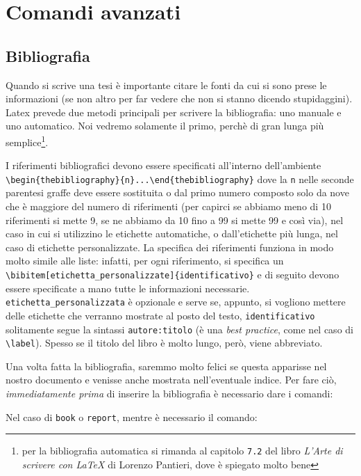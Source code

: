 \chapter{Comandi avanzati}

\section{Bibliografia}
Quando si scrive una tesi è importante citare le fonti da cui si sono prese le 
informazioni (se non altro per far vedere che non si stanno dicendo 
stupidaggini). Latex prevede due metodi principali per scrivere la 
bibliografia: uno manuale e uno automatico. Noi vedremo solamente il primo, 
perchè di gran lunga più semplice\footnote{per la bibliografia automatica si 
rimanda al capitolo \texttt{7.2} del libro \textit{L'Arte di scrivere con 
\LaTeX{}} di Lorenzo Pantieri, dove è spiegato molto bene}.
\par I riferimenti bibliografici devono essere specificati all'interno 
dell'ambiente \\\verb!\begin{thebibliography}{n}...\end{thebibliography}! dove 
la \texttt{n} nelle seconde parentesi graffe deve essere sostituita o dal 
primo numero composto solo da nove che è maggiore del numero di riferimenti 
(per capirci se abbiamo meno di 10 riferimenti si mette 9, se ne abbiamo da 10 
fino a 99 si mette 99 e così via), nel caso in cui si utilizzino le etichette 
automatiche, o dall'etichette più lunga, nel caso di etichette personalizzate. 
La specifica dei riferimenti funziona in modo molto simile alle liste: 
infatti, per ogni riferimento, si specifica un 
\verb!\bibitem[etichetta_personalizzate]{identificativo}! e di seguito devono 
essere specificate a mano tutte le informazioni necessarie. 
\verb!etichetta_personalizzata! è opzionale e serve se, appunto, si vogliono 
mettere delle etichette che verranno mostrate al posto del testo, 
\verb!identificativo! solitamente segue la sintassi \verb!autore:titolo! (è 
una \textit{best practice}, come nel caso di \verb!\label!). Spesso se il 
titolo del libro è molto lungo, però, viene abbreviato. 
\par Una volta fatta la bibliografia, saremmo molto felici se questa apparisse 
nel nostro documento e venisse anche mostrata nell'eventuale indice. Per fare 
ciò, \emph{immediatamente prima} di inserire la bibliografia è necessario dare 
i comandi:

Nel caso di \verb!book! o \verb!report!, mentre è necessario il comando:
